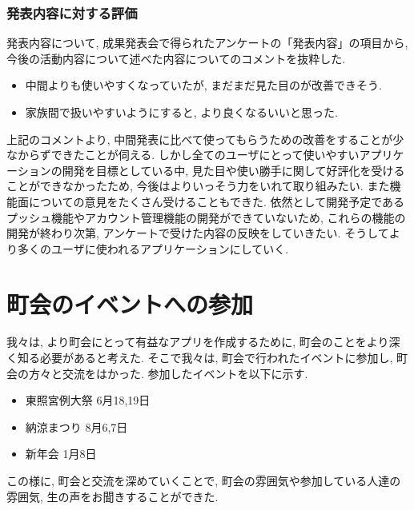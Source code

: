 \subsubsection{発表内容に対する評価}
発表内容について, 成果発表会で得られたアンケートの「発表内容」の項目から, 今後の活動内容について述べた内容についてのコメントを抜粋した.
\begin{itemize}
    \item 中間よりも使いやすくなっていたが, まだまだ見た目のが改善できそう.
    \item 家族間で扱いやすいようにすると, より良くなるいいと思った.
\end{itemize}
上記のコメントより, 中間発表に比べて使ってもらうための改善をすることが少なからずできたことが伺える. しかし全てのユーザにとって使いやすいアプリケーションの開発を目標としている中,
見た目や使い勝手に関して好評化を受けることができなかったため, 今後はよりいっそう力をいれて取り組みたい.
また機能面についての意見をたくさん受けることもできた. 依然として開発予定であるプッシュ機能やアカウント管理機能の開発ができていないため,
これらの機能の開発が終わり次第, アンケートで受けた内容の反映をしていきたい. そうしてより多くのユーザに使われるアプリケーションにしていく.

\section{町会のイベントへの参加}
我々は, より町会にとって有益なアプリを作成するために, 町会のことをより深く知る必要があると考えた.
そこで我々は, 町会で行われたイベントに参加し, 町会の方々と交流をはかった. 参加したイベントを以下に示す.
\begin{itemize}
    \item 東照宮例大祭 6月18,19日
    \item 納涼まつり   8月6,7日
    \item 新年会      1月8日
\end{itemize}
この様に, 町会と交流を深めていくことで, 町会の雰囲気や参加している人達の雰囲気, 生の声をお聞きすることができた.
